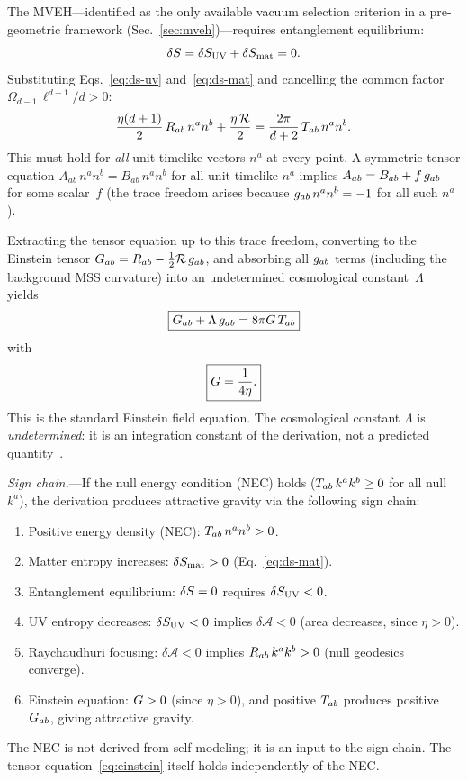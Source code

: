 The MVEH---identified as the only available vacuum selection criterion
in a pre-geometric framework
(Sec.~\ref{sec:mveh})---requires entanglement equilibrium:
\begin{equation}
  \delta S = \delta S_{\mathrm{UV}} + \delta S_{\mathrm{mat}} = 0.
  \label{eq:ee}
\end{equation}
Substituting Eqs.~\eqref{eq:ds-uv} and~\eqref{eq:ds-mat} and
cancelling the common factor $\Omega_{d-1}\, \ell^{d+1}/d > 0$:
\begin{equation}
  \frac{\eta(d+1)}{2}\, R_{ab}\, n^a n^b + \frac{\eta\, \mathcal{R}}{2}
  = \frac{2\pi}{d+2}\, T_{ab}\, n^a n^b.
  \label{eq:scalar-ee}
\end{equation}
This must hold for \emph{all} unit timelike vectors $n^a$ at every
point.  A symmetric tensor equation
$A_{ab}\, n^a n^b = B_{ab}\, n^a n^b$ for all unit timelike $n^a$
implies $A_{ab} = B_{ab} + f\, g_{ab}$ for some scalar~$f$ (the trace
freedom arises because $g_{ab}\, n^a n^b = -1$ for all such $n^a$).

Extracting the tensor equation up to this trace freedom, converting to
the Einstein tensor $G_{ab} = R_{ab} - \frac{1}{2} \mathcal{R}\, g_{ab}$, and
absorbing all $g_{ab}$ terms (including the background MSS curvature)
into an undetermined cosmological constant~$\Lambda$
yields~\cite{Jacobson2016}
\begin{equation}
  \boxed{G_{ab} + \Lambda\, g_{ab} = 8\pi G\, T_{ab}}
  \label{eq:einstein}
\end{equation}
with
\begin{equation}
  \boxed{G = \frac{1}{4\eta}.}
  \label{eq:newton}
\end{equation}
This is the standard Einstein field equation.  The cosmological
constant $\Lambda$ is \emph{undetermined}: it is an integration
constant of the derivation, not a predicted
quantity~\cite{Jacobson2016, JacobsonSperanza2019}.

\emph{Sign chain.}---If the null energy condition (NEC) holds
($T_{ab}\, k^a k^b \geq 0$ for all null $k^a$), the derivation produces
attractive gravity via the following sign chain:
\begin{enumerate}
\item Positive energy density (NEC): $T_{ab}\, n^a n^b > 0$.
\item Matter entropy increases: $\delta S_{\mathrm{mat}} > 0$
  (Eq.~\ref{eq:ds-mat}).
\item Entanglement equilibrium: $\delta S = 0$ requires
  $\delta S_{\mathrm{UV}} < 0$.
\item UV entropy decreases: $\delta S_{\mathrm{UV}} < 0$ implies
  $\delta\mathcal{A} < 0$ (area decreases, since $\eta > 0$).
\item Raychaudhuri focusing: $\delta\mathcal{A} < 0$ implies
  $R_{ab}\, k^a k^b > 0$ (null geodesics converge).
\item Einstein equation: $G > 0$ (since $\eta > 0$), and
  positive $T_{ab}$ produces positive $G_{ab}$, giving attractive gravity.
\end{enumerate}
The NEC is not derived from self-modeling; it is an input to the sign
chain.  The tensor equation~\eqref{eq:einstein} itself holds
independently of the NEC.

